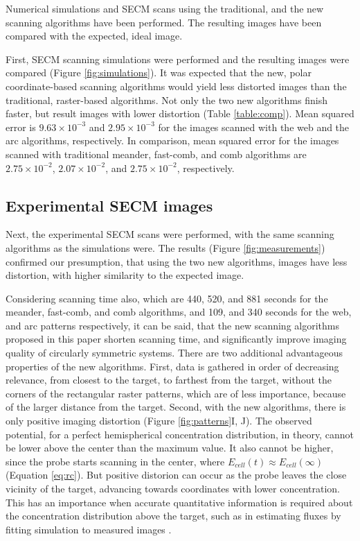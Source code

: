 Numerical simulations and SECM scans using the traditional, and the new scanning algorithms have
been performed. The resulting images have been compared with the expected, ideal image.

First, SECM scanning simulations were performed and the resulting images were compared (Figure \ref{fig:simulations}).
It was expected that the new, polar coordinate-based scanning algorithms would yield less distorted images than the traditional, raster-based algorithms.
Not only the two new algorithms finish faster, but result images with lower distortion (Table \ref{table:comp}).
Mean squared error is $9.63\times 10^{-3}$ and $2.95\times 10^{-3}$ for the images scanned with the web and the arc algorithms, respectively.
In comparison, mean squared error for the images scanned with traditional meander, fast-comb, and comb algorithms are $2.75\times 10^{-2}$, $2.07\times 10^{-2}$, and $2.75\times 10^{-2}$, respectively.

		\subsection{Experimental SECM images}
Next, the experimental SECM scans were performed, with the same scanning algorithms as the simulations were.
The results (Figure \ref{fig:measurements}) confirmed our presumption, that using the two new algorithms, images have less distortion, with higher similarity to the expected image.

Considering scanning time also, which are 440, 520, and 881 seconds for the meander, fast-comb, and comb algorithms, and 109, and 340 seconds for the web, and arc patterns respectively, it can be said, that the new scanning algorithms proposed in this paper shorten scanning time, and significantly improve imaging quality of circularly symmetric systems.
There are two additional advantageous properties of the new algorithms.
First, data is gathered in order of decreasing relevance, from closest to the target, to farthest from the target, without the corners of the rectangular raster patterns, which are of less importance, because of the larger distance from the target.
Second, with the new algorithms, there is only positive imaging distortion (Figure \ref{fig:patterns}I, J).
The observed potential, for a perfect hemispherical concentration distribution, in theory, cannot be lower above the center than the maximum value.
It also cannot be higher, since the probe starts scanning in the center, where $E_{cell}(t) \approx E_{cell}(\infty)$ (Equation \ref{eq:rc}).
But positive distorion can occur as the probe leaves the close vicinity of the target, advancing towards coordinates with lower concentration.
This has an importance when accurate quantitative information is required about the concentration distribution above the target, such as in estimating fluxes by fitting simulation to measured images \cite{gyurcsanyi2004chemical, kiss2011air}.

